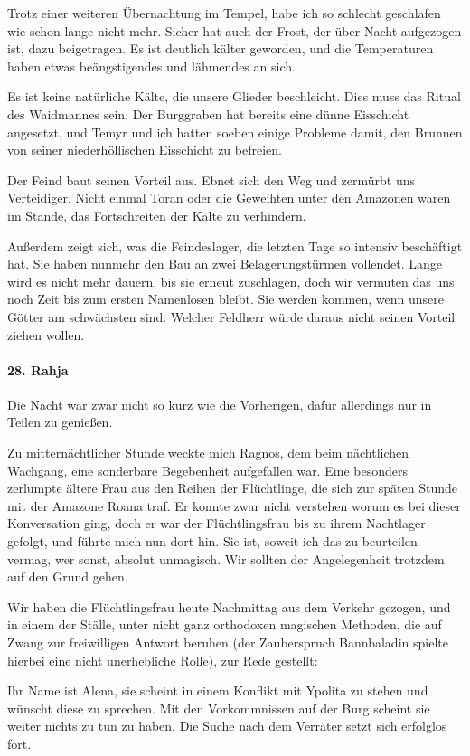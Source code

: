 Trotz einer weiteren Übernachtung im Tempel, habe ich so schlecht geschlafen wie schon lange nicht mehr. Sicher hat auch der Frost, der über Nacht aufgezogen ist, dazu beigetragen. Es ist deutlich kälter geworden, und die Temperaturen haben etwas beängstigendes und lähmendes an sich.

Es ist keine natürliche Kälte, die unsere Glieder beschleicht. Dies muss das Ritual des Waidmannes sein. Der Burggraben hat bereits eine dünne Eisschicht angesetzt, und Temyr und ich hatten soeben einige Probleme damit, den Brunnen von seiner niederhöllischen Eisschicht zu befreien.

Der Feind baut seinen Vorteil aus. Ebnet sich den Weg und zermürbt uns Verteidiger. Nicht einmal Toran oder die Geweihten unter den Amazonen waren im Stande, das Fortschreiten der Kälte zu verhindern.

Außerdem zeigt sich, was die Feindeslager, die letzten Tage so intensiv beschäftigt hat. Sie haben nunmehr den Bau an zwei Belagerungstürmen vollendet. Lange wird es nicht mehr dauern, bis sie erneut zuschlagen, doch wir vermuten das uns noch Zeit bis zum ersten Namenlosen bleibt. Sie werden kommen, wenn unsere Götter am schwächsten sind. Welcher Feldherr würde daraus nicht seinen Vorteil ziehen wollen.

\paragraph{28. Rahja}
Die Nacht war zwar nicht so kurz wie die Vorherigen, dafür allerdings nur in Teilen zu genießen.

Zu mitternächtlicher Stunde weckte mich Ragnos, dem beim nächtlichen Wachgang, eine sonderbare Begebenheit aufgefallen war. Eine besonders zerlumpte ältere Frau aus den Reihen der Flüchtlinge, die sich zur späten Stunde mit der Amazone Roana traf. Er konnte zwar nicht verstehen worum es bei dieser Konversation ging, doch er war der Flüchtlingsfrau bis zu ihrem Nachtlager gefolgt, und führte mich nun dort hin. Sie ist, soweit ich das zu beurteilen vermag, wer sonst, absolut unmagisch. Wir sollten der Angelegenheit trotzdem auf den Grund gehen.

Wir haben die Flüchtlingsfrau heute Nachmittag aus dem Verkehr gezogen, und in einem der Ställe, unter nicht ganz orthodoxen magischen Methoden, die auf Zwang zur freiwilligen Antwort beruhen (der Zauberspruch Bannbaladin spielte hierbei eine nicht unerhebliche Rolle), zur Rede gestellt:

Ihr Name ist Alena, sie scheint in einem Konflikt mit Ypolita zu stehen und wünscht diese zu sprechen. Mit den Vorkommnissen auf der Burg scheint sie weiter nichts zu tun zu haben. Die Suche nach dem Verräter setzt sich erfolglos fort.

